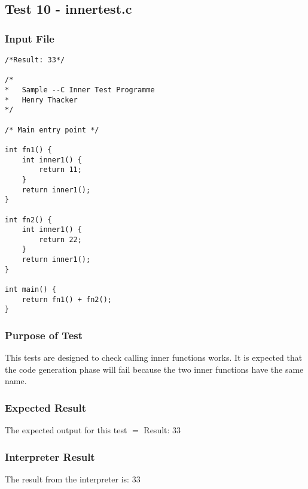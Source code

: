 \subsection{Test 10 - innertest.c}
\subsubsection{Input File}
\begin{lstlisting}[showstringspaces=false,breaklines=true,backgroundcolor=\color{light-gray}, captionpos=b]
/*Result: 33*/

/*
*	Sample --C Inner Test Programme
*	Henry Thacker
*/

/* Main entry point */

int fn1() {
	int inner1() {
		return 11;
	}
	return inner1();
}

int fn2() {
	int inner1() {
		return 22;
	}
	return inner1();
}

int main() {
	return fn1() + fn2();
}
\end{lstlisting}
\subsubsection{Purpose of Test}
This tests are designed to check calling inner functions works. It is expected that the code generation phase will fail because the two inner functions have the same name.

\subsubsection{Expected Result}
The expected output for this test $=$ Result: 33
\subsubsection{Interpreter Result}
The result from the interpreter is: 33

